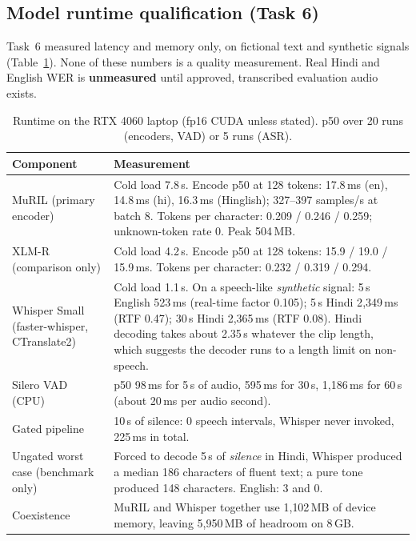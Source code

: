 \documentclass[11pt,a4paper]{article}
\begin{document}
\subsection{Model runtime qualification (Task 6)}
\label{sec:runtime}
Task~6 measured latency and memory only, on fictional text and synthetic signals
(Table~\ref{tab:runtime}). None of these numbers is a quality measurement. Real Hindi and English
WER is \textbf{unmeasured} until approved, transcribed evaluation audio exists.

\begin{table}[!htbp]
\centering\footnotesize
\caption{Runtime on the RTX 4060 laptop (fp16 CUDA unless stated). p50 over 20 runs (encoders, VAD) or 5 runs (ASR).}
\label{tab:runtime}
\begin{tabularx}{\linewidth}{@{}>{\raggedright\arraybackslash}p{3.3cm}X@{}}
\toprule
Component & Measurement \\
\midrule
MuRIL (primary encoder) & Cold load 7.8\,s. Encode p50 at 128 tokens: 17.8\,ms (en), 14.8\,ms (hi), 16.3\,ms (Hinglish); 327--397 samples/s at batch 8. Tokens per character: 0.209 / 0.246 / 0.259; unknown-token rate 0. Peak 504\,MB. \\
XLM-R (comparison only) & Cold load 4.2\,s. Encode p50 at 128 tokens: 15.9 / 19.0 / 15.9\,ms. Tokens per character: 0.232 / 0.319 / 0.294. \\
Whisper Small (faster-whisper, CTranslate2) & Cold load 1.1\,s. On a speech-like \emph{synthetic} signal: 5\,s English 523\,ms (real-time factor 0.105); 5\,s Hindi 2{,}349\,ms (RTF 0.47); 30\,s Hindi 2{,}365\,ms (RTF 0.08). Hindi decoding takes about 2.35\,s whatever the clip length, which suggests the decoder runs to a length limit on non-speech. \\
Silero VAD (CPU) & p50 98\,ms for 5\,s of audio, 595\,ms for 30\,s, 1{,}186\,ms for 60\,s (about 20\,ms per audio second). \\
Gated pipeline & 10\,s of silence: 0 speech intervals, Whisper never invoked, 225\,ms in total. \\
Ungated worst case (benchmark only) & Forced to decode 5\,s of \emph{silence} in Hindi, Whisper produced a median 186 characters of fluent text; a pure tone produced 148 characters. English: 3 and 0. \\
Coexistence & MuRIL and Whisper together use 1{,}102\,MB of device memory, leaving 5{,}950\,MB of headroom on 8\,GB. \\
\bottomrule
\end{tabularx}
\end{table}
\end{document}

